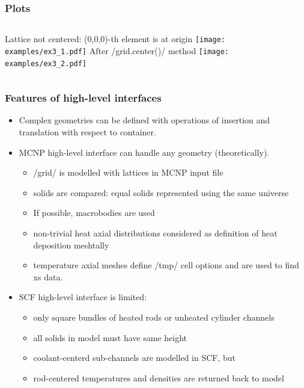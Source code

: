 \begin{frame}[fragile]
    \frametitle{Plots}
    \begin{columns}
        {\tiny Lattice not centered: (0,0,0)-th element is at origin}
            \texttt{[image: examples/ex3\_1.pdf]}
        {\tiny After \pythoninline/grid.center()/ method}
            \texttt{[image: examples/ex3\_2.pdf]}
    \end{columns}
\end{frame}
% 
% 
% 
% 
\begin{frame}[fragile]
    \frametitle{Features of  high-level interfaces}
    \begin{itemize}
        \item Complex geometries can be defined with operations of insertion and translation with respect to container.

        \item MCNP high-level interface can handle any geometry (theoretically).
            \begin{itemize}
                \item \pythoninline/grid/ is modelled with lattices in MCNP input file
                \item solids are compared: equal solids represented using the same universe
                \item If possible, macrobodies are used
                \item non-trivial heat axial distributions considered as definition of heat deposition meshtally
                \item temperature axial meshes define \bashinline/tmp/ cell options and are used to find xs data. 
            \end{itemize}

        \item SCF high-level interface  is limited: 
            \begin{itemize}
                \item only square bundles of heated rods or unheated cylinder channels
                \item all solids in model must have same height
                \item coolant-centerd sub-channels are modelled in SCF, but
                \item rod-centered temperatures and densities are returned back to model
            \end{itemize}
    \end{itemize}
\end{frame}

